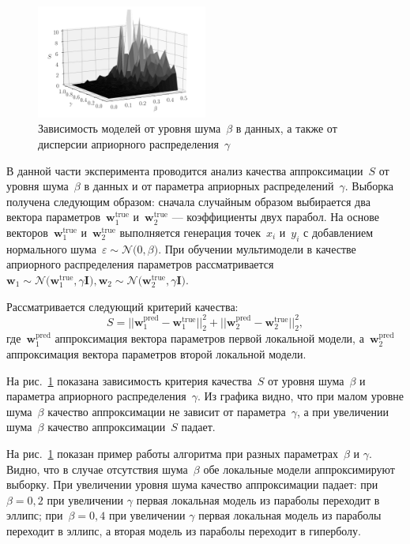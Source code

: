 \documentclass[12pt, twoside]{article}
\numberwithin{equation}{section}
\begin{document}
\begin{figure}[h!t]\center
\includegraphics[width=0.5\textwidth]{figures/3dplot}
\caption{Зависимость моделей от уровня шума~$\beta$ в данных, а также от дисперсии априорного распределения~$\gamma$}
\label{ce:fig5}
\end{figure}
В данной части эксперимента проводится анализ качества аппроксимации~$S$ от уровня шума~$\beta$ в данных и от параметра априорных распределений~$\gamma$. Выборка получена следующим образом: сначала случайным образом выбирается два вектора параметров~$\mathbf{w}^\text{true}_{1}$ и~$\mathbf{w}^\text{true}_{2}$ --- коэффициенты двух парабол. На основе векторов~$\mathbf{w}^\text{true}_{1}$ и~$\mathbf{w}^\text{true}_{2}$ выполняется генерация точек~$x_i$ и~$y_i$ с добавлением нормального шума~$\varepsilon\sim \mathcal{N}\bigr(0, \beta\bigr)$. При обучении мультимодели в качестве априорного распределения параметров рассматривается~$\mathbf{w}_1\sim\mathcal{N}\bigr(\mathbf{w}^\text{true}_{1}, \gamma\mathbf{I}\bigr),\mathbf{w}_2\sim\mathcal{N}\bigr(\mathbf{w}^\text{true}_{2}, \gamma\mathbf{I}\bigr)$.

Рассматривается следующий критерий качества:
\[
S = ||\mathbf{w}^\text{pred}_{1} - \mathbf{w}^\text{true}_{1}||^{2}_{2} + ||\mathbf{w}^\text{pred}_{2} - \mathbf{w}^\text{true}_{2}||^{2}_{2},
\]
где~$\mathbf{w}^\text{pred}_{1}$ аппроксимация вектора параметров первой локальной модели, а~$\mathbf{w}^\text{pred}_{2}$ аппроксимация вектора параметров второй локальной модели.

На рис.~\ref{ce:fig5} показана зависимость критерия качества~$S$ от уровня шума~$\beta$ и параметра априорного распределения~$\gamma$. Из графика видно, что при малом уровне шума~$\beta$ качество аппроксимации не зависит от параметра~$\gamma$, а при увеличении шума~$\beta$ качество аппроксимации~$S$ падает.

На рис.~\ref{ce:fig5} показан пример работы алгоритма при разных параметрах~$\beta$ и $\gamma$. Видно, что в случае отсутствия шума~$\beta$ обе локальные модели аппроксимируют выборку. При увеличении уровня шума качество аппроксимации падает: при~$\beta=0{,}2$ при увеличении $\gamma$ первая локальная модель из параболы переходит в эллипс; при~$\beta=0{,}4$ при увеличении  $\gamma$ первая локальная модель из параболы переходит в эллипс, а вторая модель из параболы переходит в гиперболу.
\end{document}
